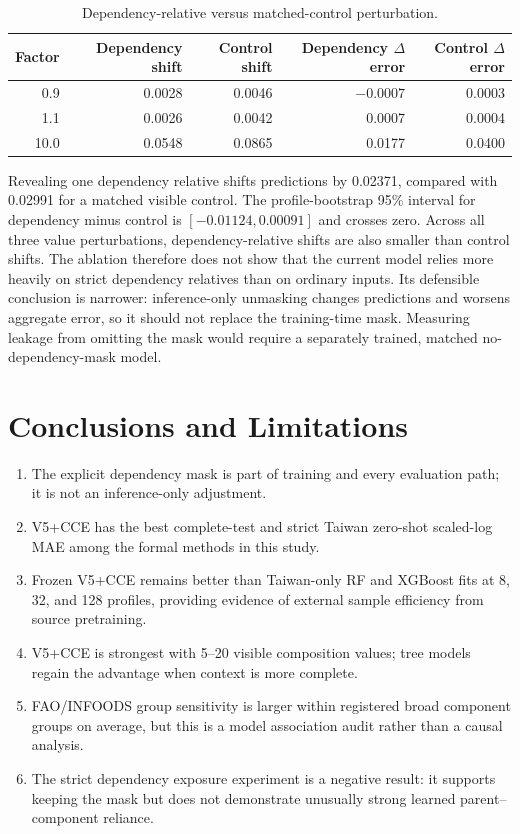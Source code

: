 \documentclass[11pt]{article}
\begin{document}
\begin{table}[H]
\centering
\caption{Dependency-relative versus matched-control perturbation.}
\begin{tabular}{@{}rrrrr@{}}
\toprule
Factor & Dependency shift & Control shift & Dependency $\Delta$error & Control $\Delta$error \\
\midrule
0.9 & 0.0028 & 0.0046 & $-0.0007$ & 0.0003 \\
1.1 & 0.0026 & 0.0042 & 0.0007 & 0.0004 \\
10.0 & 0.0548 & 0.0865 & 0.0177 & 0.0400 \\
\bottomrule
\end{tabular}
\end{table}

Revealing one dependency relative shifts predictions by 0.02371, compared with 0.02991 for a matched visible control. The profile-bootstrap 95\% interval for dependency minus control is $[-0.01124,0.00091]$ and crosses zero. Across all three value perturbations, dependency-relative shifts are also smaller than control shifts. The ablation therefore does not show that the current model relies more heavily on strict dependency relatives than on ordinary inputs. Its defensible conclusion is narrower: inference-only unmasking changes predictions and worsens aggregate error, so it should not replace the training-time mask. Measuring leakage from omitting the mask would require a separately trained, matched no-dependency-mask model.

\section{Conclusions and Limitations}

\begin{enumerate}
  \item The explicit dependency mask is part of training and every evaluation path; it is not an inference-only adjustment.
  \item V5+CCE has the best complete-test and strict Taiwan zero-shot scaled-log MAE among the formal methods in this study.
  \item Frozen V5+CCE remains better than Taiwan-only RF and XGBoost fits at 8, 32, and 128 profiles, providing evidence of external sample efficiency from source pretraining.
  \item V5+CCE is strongest with 5--20 visible composition values; tree models regain the advantage when context is more complete.
  \item FAO/INFOODS group sensitivity is larger within registered broad component groups on average, but this is a model association audit rather than a causal analysis.
  \item The strict dependency exposure experiment is a negative result: it supports keeping the mask but does not demonstrate unusually strong learned parent--component reliance.
\end{enumerate}
\end{document}
